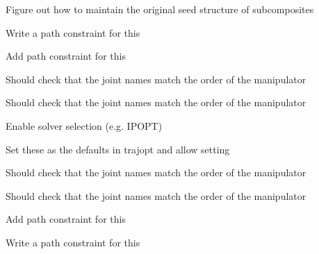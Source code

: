 \begin{DoxyRefList}
%
Figure out how to maintain the original seed structure of subcomposites  
\item[Member \mbox{\hyperlink{classtesseract__planning_1_1TrajOptIfoptMotionPlanner_a0191acdc9d5cdc9d73482dbe07873d8c}{tesseract\+\_\+planning\+::Traj\+Opt\+Ifopt\+Motion\+Planner\+::create\+Problem}} (const std\+::string \&name, const \mbox{\hyperlink{structtesseract__planning_1_1PlannerRequest}{Planner\+Request}} \&request) const]\label{todo__todo000028}%
%
Write a path constraint for this 

\label{todo__todo000029}%
%
Add path constraint for this 

\label{todo__todo000030}%
%
Should check that the joint names match the order of the manipulator 

\label{todo__todo000031}%
%
Should check that the joint names match the order of the manipulator  
\item[Member \mbox{\hyperlink{classtesseract__planning_1_1TrajOptIfoptMotionPlanner_aa86732e70ee5102815d15b896927e14d}{tesseract\+\_\+planning\+::Traj\+Opt\+Ifopt\+Motion\+Planner\+::solve}} (const \mbox{\hyperlink{structtesseract__planning_1_1PlannerRequest}{Planner\+Request}} \&request, \mbox{\hyperlink{structtesseract__planning_1_1PlannerResponse}{Planner\+Response}} \&response, bool verbose=false) const override]\label{todo__todo000026}%
%
Enable solver selection (e.\+g. IPOPT) 

\label{todo__todo000027}%
%
Set these as the defaults in trajopt and allow setting  
\item[Member \mbox{\hyperlink{classtesseract__planning_1_1TrajOptMotionPlanner_a6f471ef6cd0a838490ca79f50c580d9f}{tesseract\+\_\+planning\+::Traj\+Opt\+Motion\+Planner\+::create\+Problem}} (const std\+::string \&name, const \mbox{\hyperlink{structtesseract__planning_1_1PlannerRequest}{Planner\+Request}} \&request) const]\label{todo__todo000025}%
%
Should check that the joint names match the order of the manipulator 

\label{todo__todo000024}%
%
Should check that the joint names match the order of the manipulator 

\label{todo__todo000023}%
%
Add path constraint for this 

\label{todo__todo000022}%
%
Write a path constraint for this 
\end{DoxyRefList}